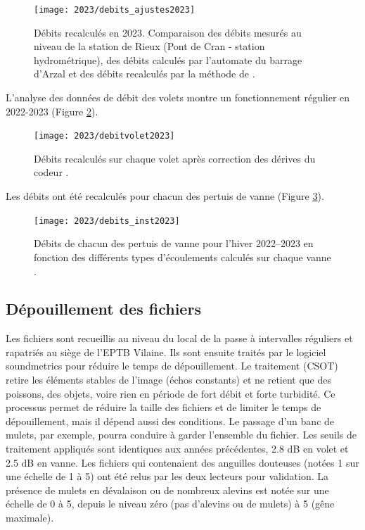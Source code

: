 \documentclass[11pt,twocolumn,titlepage,twoside]{article}
\begin{document}
\begin{figure}[htbp]
\centering
\texttt{[image: 2023/debits\_ajustes2023]}
\caption[Débits recalculés 2023]{Débits recalculés en 2023.
Comparaison des débits mesurés au niveau de la station de Rieux (Pont de Cran - station
hydrométrique), des débits calculés par l'automate du barrage d'Arzal et des
débits recalculés par la méthode de \citet{briand_note_2015}.}
\label{debits_ajustes}
\end{figure}

L'analyse des données de débit des volets montre un fonctionnement régulier en
2022-2023 (Figure \ref{debitvoletjour}).

\begin{figure}[htbp]
\centering
\texttt{[image: 2023/debitvolet2023]}
\caption[Débits volet 2023]{Débits recalculés sur chaque volet après correction
des dérives du codeur \citep{briand_note_2015}.}
\label{debitvoletjour}
\end{figure}

Les débits ont été recalculés pour chacun des pertuis de vanne
(Figure \ref{debits_inst2023}).

\begin{figure}[htbp]
\centering
\texttt{[image: 2023/debits\_inst2023]}
\caption[Débits sur chaque pertuis de vanne pour l'hiver 2022--2023]{Débits de
chacun des pertuis de vanne pour l'hiver 2022--2023 en
fonction des différents types d'écoulements calculés
sur chaque vanne \citep{briand_note_2015}.}
\label{debits_inst2023}
\end{figure}

\subsection{Dépouillement des fichiers}\label{par_depouillement}

Les fichiers sont recueillis au niveau du local de la passe à intervalles réguliers et rapatriés 
au siège de l'EPTB Vilaine. Ils sont ensuite traités par le logiciel
soundmetrics pour réduire le temps de dépouillement.
Le traitement (CSOT) retire les éléments stables de l'image (échos constants) et ne retient que des
poissons, des objets, voire rien en période de fort débit et forte turbidité. Ce
processus permet de réduire la taille des fichiers et de limiter le temps de dépouillement, mais il dépend aussi des conditions. Le passage d'un banc de mulets,
par exemple, pourra conduire à garder l'ensemble du fichier. 
Les seuils de traitement appliqués sont identiques aux années précédentes, 2.8 dB en volet et 2.5 dB en vanne.
Les fichiers qui contenaient des anguilles douteuses (notées 1 sur une échelle de 1 à 5) ont été relus par les deux lecteurs pour validation. 
La présence de mulets en dévalaison ou de nombreux alevins est notée sur une échelle de 0 à 5, 
depuis le niveau zéro (pas d'alevins ou de mulets) à 5 (gêne maximale).
\end{document}

